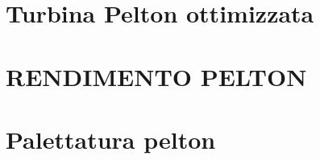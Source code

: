 \documentclass[a4paper, 15pt]{article}
\begin{document}
		
		
		
\section{Turbina Pelton ottimizzata}

\section{RENDIMENTO PELTON} 
\section{Palettatura pelton}
\end{document}
